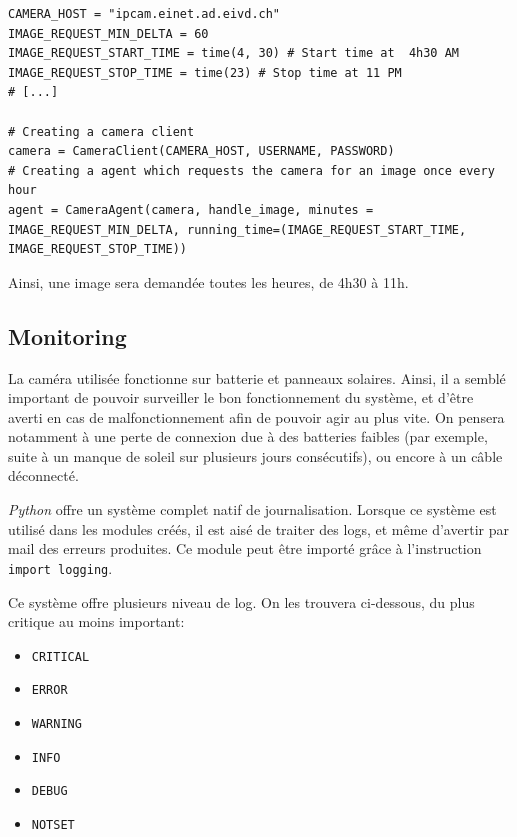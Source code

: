\begin{lstlisting}[caption={Création d'un agent récupérant les images}, label={lst:agent}] 
CAMERA_HOST = "ipcam.einet.ad.eivd.ch"
IMAGE_REQUEST_MIN_DELTA = 60
IMAGE_REQUEST_START_TIME = time(4, 30) # Start time at  4h30 AM
IMAGE_REQUEST_STOP_TIME = time(23) # Stop time at 11 PM
# [...]

# Creating a camera client
camera = CameraClient(CAMERA_HOST, USERNAME, PASSWORD)
# Creating a agent which requests the camera for an image once every hour
agent = CameraAgent(camera, handle_image, minutes = IMAGE_REQUEST_MIN_DELTA, running_time=(IMAGE_REQUEST_START_TIME, IMAGE_REQUEST_STOP_TIME))
\end{lstlisting}

Ainsi, une image sera demandée toutes les heures, de 4h30 à 11h.

\subsection{Monitoring}
La caméra utilisée fonctionne sur batterie et panneaux solaires. Ainsi, il a semblé important de pouvoir surveiller le bon fonctionnement du système, et d'être averti en cas de malfonctionnement afin de pouvoir agir au plus vite. On pensera notamment à une perte de connexion due à des batteries faibles (par exemple, suite à un manque de soleil sur plusieurs jours consécutifs), ou encore à un câble déconnecté.

\textit{Python} offre un système complet natif de journalisation. Lorsque ce système est utilisé dans les modules créés, il est aisé de traiter des logs, et même d'avertir par mail des erreurs produites. Ce module peut être importé grâce à l'instruction \lstinline[columns=fixed]{import logging}.

Ce système offre plusieurs niveau de log. On les trouvera ci-dessous, du plus critique au moins important\autocite{doc:log}:
\begin{itemize}
    \item \lstinline[columns=fixed]{CRITICAL}
    \item \lstinline[columns=fixed]{ERROR}
    \item \lstinline[columns=fixed]{WARNING}
    \item \lstinline[columns=fixed]{INFO}
    \item \lstinline[columns=fixed]{DEBUG}
    \item \lstinline[columns=fixed]{NOTSET}
\end{itemize}

